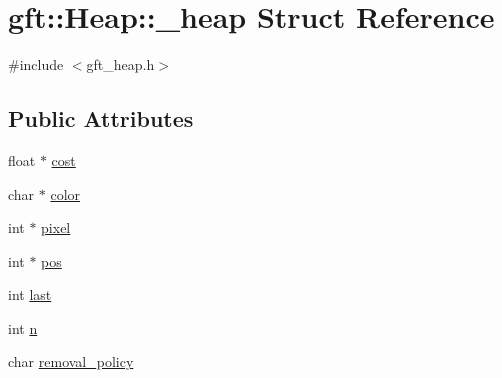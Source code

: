 \hypertarget{structgft_1_1Heap_1_1__heap}{\section{gft\-:\-:Heap\-:\-:\-\_\-heap Struct Reference}
\label{structgft_1_1Heap_1_1__heap}
}


{\ttfamily \#include $<$gft\-\_\-heap.\-h$>$}

\subsection*{Public Attributes}
\begin{DoxyCompactItemize}
\item 
float $\ast$ \hyperlink{structgft_1_1Heap_1_1__heap_aee4714d42b3d802eca399f42ec3eefe3}{cost}
\item 
char $\ast$ \hyperlink{structgft_1_1Heap_1_1__heap_a788d4201fea14246526f0892f4b524c4}{color}
\item 
int $\ast$ \hyperlink{structgft_1_1Heap_1_1__heap_a2adc9acd11d99a47120c111e4f971df9}{pixel}
\item 
int $\ast$ \hyperlink{structgft_1_1Heap_1_1__heap_a3d65b8de1db1ed23954e74e6718c25b9}{pos}
\item 
int \hyperlink{structgft_1_1Heap_1_1__heap_a410e072df081c3945d99c5fa8757b8b3}{last}
\item 
int \hyperlink{structgft_1_1Heap_1_1__heap_a6ddcefe0a427408a50d3ad38ca119363}{n}
\item 
char \hyperlink{structgft_1_1Heap_1_1__heap_a5e4f64670064ae421d361d11fe1565b3}{removal\-\_\-policy}
\end{DoxyCompactItemize}


